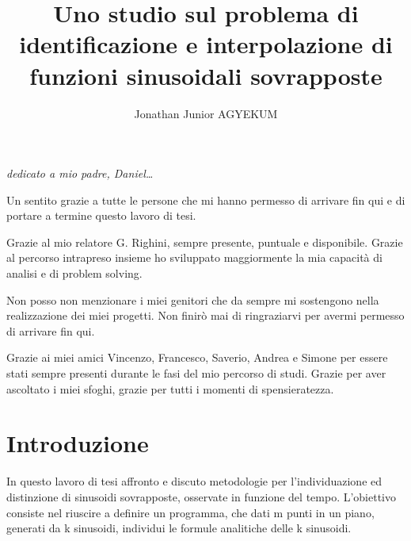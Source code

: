 \documentclass[a4paper,12pt]{report}
\begin{document}
\title{Uno studio sul problema di identificazione e interpolazione di funzioni sinusoidali sovrapposte}
\author{Jonathan Junior AGYEKUM}
%
%
%
\beforepreface
\prefacesection{}
        {\hfill \Large {\sl dedicato a mio padre, Daniel\dots}}
%
%

%
%
Un sentito grazie a tutte le persone che mi hanno permesso di arrivare fin qui e di portare a termine questo lavoro di tesi.

Grazie al mio relatore G. Righini, sempre presente, puntuale e disponibile. Grazie al percorso intrapreso insieme ho sviluppato maggiormente la mia capacità di analisi e di problem solving.

Non posso non menzionare i miei genitori che da sempre mi sostengono nella realizzazione dei miei progetti. Non finirò mai di ringraziarvi per avermi permesso di arrivare fin qui.

Grazie ai miei amici Vincenzo, Francesco, Saverio, Andrea e Simone per essere stati sempre presenti durante le fasi del mio percorso di studi. Grazie per aver ascoltato i miei sfoghi, grazie per tutti i momenti di spensieratezza.

\afterpreface
%
%
\chapter{Introduzione}
\label{cap1}
In questo lavoro di tesi affronto e discuto metodologie per l'individuazione ed distinzione di sinusoidi sovrapposte, osservate in funzione del tempo. L'obiettivo consiste nel riuscire a definire un programma, che dati m punti in un piano, generati da k sinusoidi, individui le formule analitiche delle k sinusoidi.
\end{document}
